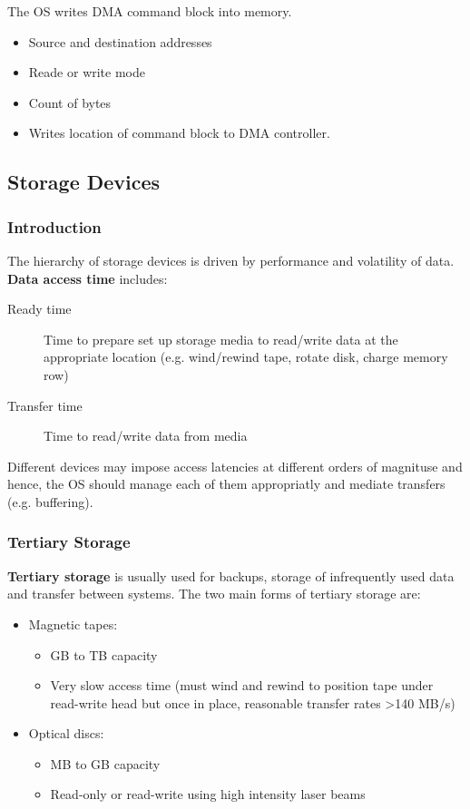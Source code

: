 \documentclass{article}%
\begin{document}
The OS writes DMA command block into memory.
\begin{itemize}
\item Source and destination addresses
\item Reade or write mode
\item Count of bytes
\item Writes location of command block to DMA controller.
\end{itemize}

\subsection{Storage Devices}
\label{sec:org086e042}
\subsubsection{Introduction}
\label{sec:orge22b44d}
The hierarchy of storage devices is driven by performance and volatility of data.
\textbf{Data access time} includes:
\begin{description}
\item[{Ready time}] Time to prepare set up storage media to read/write data at the appropriate location (e.g. wind/rewind tape, rotate disk, charge memory row)
\item[{Transfer time}] Time to read/write data from media
\end{description}
Different devices may impose access latencies at different orders of magnituse and hence, the OS should manage each of them appropriatly and mediate transfers (e.g. buffering).
\subsubsection{Tertiary Storage}
\label{sec:org5e9bb57}
\textbf{Tertiary storage} is usually used for backups, storage of infrequently used data and transfer between systems.
The two main forms of tertiary storage are:
\begin{itemize}
\item Magnetic tapes:
\begin{itemize}
\item GB to TB capacity
\item Very slow access time (must wind and rewind to position tape under read-write head but once in place, reasonable transfer rates >140 MB/s)
\end{itemize}
\item Optical discs:
\begin{itemize}
\item MB to GB capacity
\item Read-only or read-write using high intensity laser beams
\end{itemize}
\end{itemize}
\end{document}
